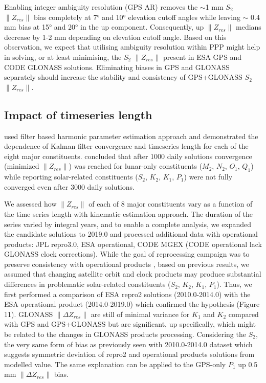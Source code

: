 \documentclass[se, manuscript]{copernicus}
\begin{document}
Enabling integer ambiguity resolution (GPS AR) removes the $\sim$1 mm $S_2$ $\|Z_{res}\|$ bias completely at 7° and 10° elevation cutoff angles while leaving $\sim$ 0.4 mm bias at 15° and 20° in the up component. Consequently, up $\|Z_{res}\|$ medians decrease by 1-2 mm depending on elevation cutoff angle. Based on this observation, we expect that utilising ambiguity resolution within PPP might help in solving, or at least minimising, the $S_2$ $\|Z_{res}\|$ present in ESA GPS and CODE GLONASS solutions. Eliminating biases in GPS and GLONASS separately should increase the stability and consistency of GPS+GLONASS $S_2$ $\|Z_{res}\|$.

\subsection{Impact of timeseries length}
\cite{Yuan2013} used filter based harmonic parameter estimation approach and demonstrated the dependence of Kalman filter convergence and timeseries length for each of the eight major constituents. \cite{Yuan2013} concluded that after 1000 daily solutions convergence (minimized $\|Z_{res}\|$) was reached for lunar-only constituents ($M_2$, $N_2$, $O_1$, $Q_1$) while reporting solar-related constituents ($S_2$, $K_2$, $K_1$, $P_1$) were not fully converged even after 3000 daily solutions.

We assessed how $\|Z_{res}\|$ of each of 8 major constituents vary as a function of the time series length with kinematic estimation approach. The duration of the series varied by integral years, and to enable a complete analysis, we expanded the candidate solutions to 2019.0 and processed additional data with operational products: JPL repro3.0, ESA operational, CODE MGEX (CODE operational lack GLONASS clock corrections). While the goal of reprocessing campaign was to preserve consistency with operational products \citep{Griffiths2019}, based on previous results, we assumed that changing satellite orbit and clock products may produce substantial differences in problematic solar-related constituents ($S_2$, $K_2$, $K_1$, $P_1$). Thus, we first performed a comparison of ESA repro2 solutions (2010.0-2014.0) with the ESA operational product (2014.0-2019.0) which confirmed the hypothesis (Figure 11). GLONASS $\|\Delta Z_{res}\|$ are still of minimal variance for $K_1$ and $K_2$ compared with GPS and GPS+GLONASS but are significant, up specifically, which might be related to the changes in GLONASS products processing. Considering the $S_2$, the very same form of bias as previously seen with 2010.0-2014.0 dataset which suggests symmetric deviation of repro2 and operational products solutions from modelled value. The same explanation can be applied to the GPS-only $P_1$ up 0.5 mm $\|\Delta Z_{res}\|$ bias.
\end{document}
